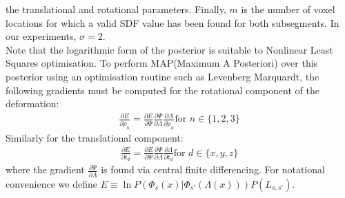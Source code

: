 the translational and rotational parameters. Finally, $m$ is the number of voxel locations for which a valid SDF value has been found for both subsegments. In our experiments, $\sigma = 2$.\\
Note that the logarithmic form of the posterior is suitable to Nonlinear Least Squares optimisation. To perform MAP(Maximum A Posteriori) over this posterior using 
an optimisation routine such as Levenberg Marquardt, the following gradients must be computed for the rotational component of the 
deformation:
\begin{equation}
\begin{split}
\frac{\partial E}{\partial \rho_{n}} = \frac{\partial E}{\partial \Psi} \frac{\partial \Psi}{\partial \Lambda} \frac{\partial \Lambda}{\partial \rho_{n}} \text{for } n \in \{1,2,3\}
\end{split}
\end{equation}
Similarly for the translational component:
\begin{equation}
\begin{split}
\frac{\partial E}{\partial t_{d}} = \frac{\partial E}{\partial \Psi} \frac{\partial \Psi}{\partial \Lambda} \frac{\partial \Lambda}{\partial t_{d}} \text{for } d \in  \{x,y,z\}
\end{split}
\end{equation}
where the gradient $\frac{\partial \Psi}{\partial \Lambda}$ is found via central finite differencing.
For notational convenience we define $E \equiv \ln P(\Phi_{s}(x) | \Phi_{s'}(\Lambda(x)))P(L_{s, s'})$.

